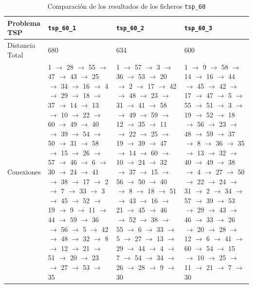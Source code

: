 \documentclass[a4paper,11pt]{article}
\begin{document}
\begin{table}[!htbp]
\label{results_tsp_60}
\centering
\begin{tabularx}{\textwidth}{|p{2cm}|X|X|X|}
\hline
Problema TSP    & \texttt{tsp\_60\_1}   & \texttt{tsp\_60\_2}   & \texttt{tsp\_60\_3}	\\ \hline
Distancia Total & 680   & 634   & 600   \\ \hline
Conexiones    & 1 $\to$ 28 $\to$ 55 $\to$ 47 $\to$ 43 $\to$ 25 $\to$ 34 $\to$ 16 $\to$ 4 $\to$ 29 $\to$ 18 $\to$ 37 $\to$ 14 $\to$ 13 $\to$ 10 $\to$ 22 $\to$ 60 $\to$ 49 $\to$ 40 $\to$ 39 $\to$ 54 $\to$ 50 $\to$ 31 $\to$ 58 $\to$ 15 $\to$ 26 $\to$ 57 $\to$ 46 $\to$ 6 $\to$ 30 $\to$ 24 $\to$ 41 $\to$ 38 $\to$ 17 $\to$ 2 $\to$ 7 $\to$ 33 $\to$ 3 $\to$ 45 $\to$ 52 $\to$ 19 $\to$ 9 $\to$ 11 $\to$ 44 $\to$ 59 $\to$ 36 $\to$ 56 $\to$ 5 $\to$ 42 $\to$ 48 $\to$ 32 $\to$ 8 $\to$ 12 $\to$ 21 $\to$ 51 $\to$ 20 $\to$ 23 $\to$ 27 $\to$ 53 $\to$ 35	& 1 $\to$ 57 $\to$ 3 $\to$ 36 $\to$ 53 $\to$ 20 $\to$ 2 $\to$ 17 $\to$ 42 $\to$ 48 $\to$ 23 $\to$ 31 $\to$ 41 $\to$ 58 $\to$ 49 $\to$ 59 $\to$ 12 $\to$ 35 $\to$ 11 $\to$ 22 $\to$ 25 $\to$ 19 $\to$ 39 $\to$ 47 $\to$ 14 $\to$ 60 $\to$ 10 $\to$ 24 $\to$ 32 $\to$ 37 $\to$ 15 $\to$ 56 $\to$ 50 $\to$ 40 $\to$ 8 $\to$ 18 $\to$ 51 $\to$ 43 $\to$ 16 $\to$ 21 $\to$ 45 $\to$ 46 $\to$ 52 $\to$ 38 $\to$ 55 $\to$ 6 $\to$ 33 $\to$ 5 $\to$ 27 $\to$ 13 $\to$ 29 $\to$ 44 $\to$ 4 $\to$ 7 $\to$ 54 $\to$ 34 $\to$ 26 $\to$ 28 $\to$ 9 $\to$ 30	& 1 $\to$ 9 $\to$ 58 $\to$ 14 $\to$ 16 $\to$ 44 $\to$ 45 $\to$ 42 $\to$ 17 $\to$ 47 $\to$ 5 $\to$ 55 $\to$ 51 $\to$ 3 $\to$ 19 $\to$ 52 $\to$ 18 $\to$ 56 $\to$ 23 $\to$ 48 $\to$ 59 $\to$ 37 $\to$ 8 $\to$ 36 $\to$ 35 $\to$ 13 $\to$ 32 $\to$ 40 $\to$ 49 $\to$ 38 $\to$ 4 $\to$ 27 $\to$ 50 $\to$ 22 $\to$ 24 $\to$ 31 $\to$ 2 $\to$ 34 $\to$ 57 $\to$ 39 $\to$ 53 $\to$ 29 $\to$ 43 $\to$ 46 $\to$ 33 $\to$ 26 $\to$ 20 $\to$ 28 $\to$ 12 $\to$ 6 $\to$ 41 $\to$ 60 $\to$ 54 $\to$ 15 $\to$ 10 $\to$ 25 $\to$ 11 $\to$ 21 $\to$ 7 $\to$ 30    \\ \hline
\end{tabularx}
\caption{Comparación de los resultados de los ficheros \texttt{tsp\_60}}
\end{table}
\end{document}
